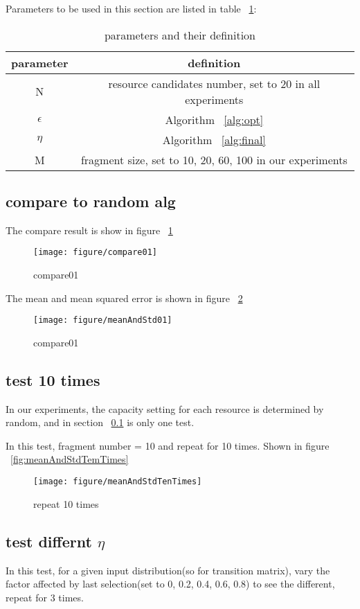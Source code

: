 \documentclass[11pt,a4paper]{article}
\begin{document}
Parameters to be used in this section are listed in table ~\ref {table:parameter}:
\begin{table}
\centering
\caption{parameters and their definition}
\begin{tabular}{|c|c|}
\hline
parameter & definition \\
\hline
N & resource candidates number, set to 20 in all experiments \\
\hline
$\epsilon$ & Algorithm ~\ref{alg:opt} \\
\hline
$\eta$ & Algorithm ~\ref{alg:final} \\
\hline
M & fragment size, set to 10, 20, 60, 100 in our experiments \\
\hline
\end{tabular}
\label{table:parameter}
\end{table}

\subsection{\textbf{compare to random alg}}
\label{sec:test01}
The compare result is show in figure ~\ref {fig:compare01}
\begin{figure}[h]
\centering
\texttt{[image: figure/compare01]}
\caption{compare01}
\label{fig:compare01}
\end{figure}

The mean and mean squared error is shown in figure ~\ref{fig:meanAndStd01}
\begin{figure}[h]
\centering
\texttt{[image: figure/meanAndStd01]}
\caption{compare01}
\label{fig:meanAndStd01}
\end{figure}

\subsection{\textbf{test 10 times}}
\label{sec:repeatTenTimes}
In our experiments, the capacity setting for each resource is determined by random,
and in section ~\ref{sec:test01} is only one test.

In this test, fragment number = 10 and repeat for 10 times.
Shown in figure ~\ref{fig:meanAndStdTemTimes}
\begin{figure}[h]
\centering
\texttt{[image: figure/meanAndStdTenTimes]}
\caption{repeat 10 times}
\label{fig:meanAndStdTenTimes}
\end{figure}

\subsection{\textbf{test differnt $\eta$}}
In this test, for a given input distribution(so for transition matrix),
vary the factor affected by last selection(set to 0, 0.2, 0.4, 0.6, 0.8) to see the different,
repeat for 3 times.
\end{document}
